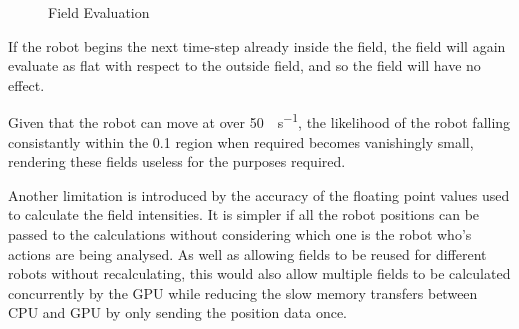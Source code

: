 \documentclass[10pt]{article}
\begin{document}
\begin{figure}
  \caption{Field Evaluation}
\end{figure}

If the robot begins the next time-step already inside the field, the field will
again evaluate as flat with respect to the outside field, and so the field will
have no effect.

Given that the robot can move at over \SI{50}{\inch\per\second}, the likelihood
of the robot falling consistantly within the \SI{0.1}{\inch} region when
required becomes vanishingly small, rendering these fields useless for the
purposes required.

Another limitation is introduced by the accuracy of the floating point values
used to calculate the field intensities.  It is simpler if all the robot
positions can be passed to the calculations without considering which one is the
robot who's actions are being analysed.  As well as allowing fields to be reused
for different robots without recalculating, this would also allow multiple
fields to be calculated concurrently by the GPU while reducing the slow
memory transfers between CPU and GPU by only sending the position data
once.
\end{document}

